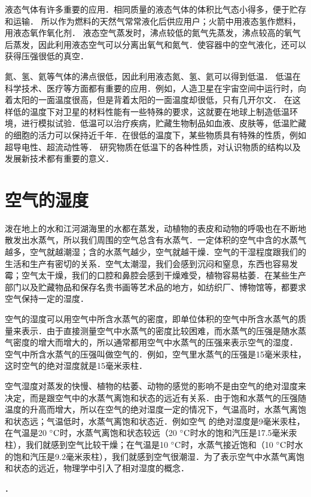 液态气体有许多重要的应用．相同质量的液态气体的体积比气态小得多，便于贮存和运输．
所以作为燃料的天然气常常液化后供应用户；火箭中用液态氢作燃料，用液态氧作氧化剂．
液态空气蒸发时，沸点较低的氮气先蒸发，沸点较高的氧气后蒸发，因此利用液态空气可以分离出氧气和氮气．使容器中的空气液化，还可以获得压强很低的真空．

氮、氢、氦等气体的沸点很低，因此利用液态氮、氢、氦可以得到低温．
低温在科学技术、医疗等方面都有重要的应用．例如，人造卫星在宇宙空间中运行时，向着太阳的一面温度很高，但是背着太阳的一面温度却很低，只有几开尔文．
在这样低的温度下对卫星的材料性能有一些特殊的要求，这就要在地球上制造低温环境，进行模拟试验．低温可以治疗疾病，贮藏生物制品如血液、皮肤等，低温贮藏的细胞的活力可以保持近千年．在很低的温度下，某些物质具有特殊的性质，例如超导电性、超流动性等．
研究物质在低温下的各种性质，对认识物质的结构以及发展新技术都有重要的意义．

\section{空气的湿度}
泼在地上的水和江河湖海里的水都在蒸发，动植物的表皮和动物的呼吸也在不断地散发出水蒸气，所以我们周围的空气总含有水蒸气．一定体积的空气中含的水蒸气越多，空气就越潮湿；含的水蒸气越少，空气就越干燥．空气的干湿程度跟我们的生活和生产有密切的关系．空气太潮湿，我们会感到沉闷和窒息，东西也容易发霉；空气太干燥，我们的口腔和鼻腔会感到干燥难受，植物容易枯萎．在某些生产部门以及贮藏物品和保存名贵书画等艺术品的地方，如纺织厂、博物馆等，都要求空气保持一定的湿度．

空气的湿度可以用空气中所含水蒸气的密度，即单位体积的空气中所含水蒸气的质量来表示．由于直接测量空气中水蒸气的密度比较困难，而水蒸气的压强是随水蒸气密度的增大而增大的，所以通常都用空气中水蒸气的压强来表示空气的湿度．
空气中所含水蒸气的压强叫做空气的．例如，空气里水蒸气的压强是15毫米汞柱，这时空气的绝对湿度就是15毫米汞柱．

空气湿度对蒸发的快慢、植物的枯萎、动物的感觉的影响不是由空气的绝对湿度来决定，而是跟空气中的水蒸气离饱和状态的远近有关系．由于饱和水蒸气的压强随温度的升高而增大，所以在空气的绝对湿度一定的情况下，气温高时，水蒸气离饱和状态远；气温低时，水蒸气离饱和状态近．例如空气
的绝对湿度是9毫米汞柱，在气温是20$\;{}^\circ\text{C}$时，水蒸气离饱和状态较远（20$\;{}^\circ\text{C}$时水的饱和汽压是17.5毫米汞柱），我们就感到空气比较干燥；在气温是10$\;{}^\circ\text{C}$时，水蒸气接近饱和（10$\;{}^\circ\text{C}$时水的饱和汽压是9.2毫米汞柱），我们就感到空气很潮湿．为了表示空气中水蒸气离饱和状态的远近，物理学中引入了相对湿度的概念．

．

